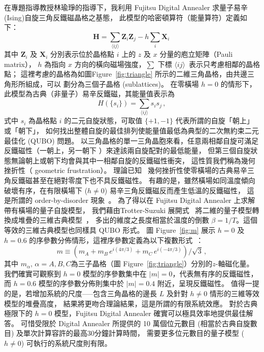 \documentclass[12pt]{article}
\newcommand{\abs}[1]{\lvert#1\rvert}
\newcommand{\e}[1]{\langle {#1}\rangle}
\newcommand{\be}{\begin{equation}}
\newcommand{\ee}{\end{equation}}
\begin{document}
在專題指導教授林瑜琤的指導下，我利用 Fujitsu Digital Annealer 求量子易辛(Ising)自旋三角反鐵磁晶格之基態，
此模型的哈密頓算符（能量算符）定義如下：
\be
   \bm{H}= \sum_{\e{ij}} \bm{Z}_i\bm{Z}_j - h\sum_i \bm{X}_i\,
    \label{eq:qising}
\ee 
其中 $\bm{Z}_i$ 及 $\bm{X}_i$ 分別表示位於晶格點 $i$ 上的 $z$ 及 $x$ 分量的庖立矩陣（Pauli matrix），
$h$ 為指向 $x$ 方向的橫向磁場強度，$\sum$ 下標 $\e{ij}$\ 表示只考慮相鄰的晶格點；
這裡考慮的晶格為如圖Figure~\ref{fig:triangle} 所示的二維三角晶格，由共邊三角形所組成，可以
劃分為三個子晶格 (sublattices)。
在零橫場 $h=0$ 的情形下，此模型為古典（非量子）易辛反鐵磁，其能量值表示為
\be
    H(\{ s_i \}) = \sum_{\e{ij}} s_i s_j\,,
    \label{eq:ising}    
\ee
式中 $s_i$ 為晶格點 $i$ 的二元自旋狀態，可取值 $\{+1,-1\}$ 代表所謂的自旋「朝上」或「朝下」，
如何找出整體自旋的最佳排列使能量值最低為典型的二次無約束二元最佳化 (QUBO) 問題。
以三角晶格的單一三角晶胞來看，任意兩相鄰自旋可滿足反鐵磁性（一朝上，另一朝下 ）來達該兩自旋配對的最低能量，
但第三個自旋狀態無論朝上或朝下均會與其中一相鄰自旋的反鐵磁性衝突，
這性質我們稱為幾何挫折性（ geometric frustration）。
理論已知~\cite{Wannier,Jiang}  幾何挫折性使零橫場的古典易辛三角反鐵磁甚至在絕對零度下也不具反鐵磁性。
有趣的是，雖然橫場如同溫度傾向破壞有序，在有限橫場下 ($h\neq 0$) 易辛三角反鐵磁反而產生低溫的反鐵磁性，
這是所謂的 order-by-disorder 現象~\cite{Moessner}。
為了得以在 Fujitsu Digital Annealer 上求解帶有橫場的量子自旋模型，
我們藉由Trotter-Suzuki 展開式~\cite{Textbook} 將二維的量子模型轉換成堆疊的三維古典模型~\cite{Moessner}，
多出的維度之長度相當於溫度的倒數 $\beta=1/T$。這個等效的三維古典模型也同樣具 QUBO 形式。
圖 Figure~\ref{fig:m} 展示 $h=0$ 及 $h=0.6$ 的序參數分佈情形，這裡序參數定義為以下複數形式~\cite{Moessner}：
\be
     m \equiv \left(m_A+m_B\,e^{i(4\pi/3)}+m_C\,e^{i(-4\pi/3)} \right)/\sqrt{3}\,,
     \label{eq:m}
\ee
其中 $m_\alpha,\,\alpha=A,B,C$為三子晶格（圖 Figure~\ref{fig:triangle}）分別的$z$-軸磁化量。
我們確實可觀察到 $h=0$ 模型的序參數集中在 $\abs{m}=0$，代表無有序的反鐵磁性，
而 $h=0.6$ 模型的序參數分佈則集中於 $\abs{m}=0.4$ 附近，呈現反鐵磁性。
值得一提的是，若增加系統的尺度-----包含三角晶格的邊長 $L$ 及針對 $h\neq 0$ 情形的三維等效模型的堆疊高度，
結果將更吻合理論結果，這是所謂的有限系統效應。
對於古典極限下的 $h=0$ 模型，Fujitsu Digital Annealer 確實可以極具效率地提供最佳解答。
可惜受限於 Digital Annealer 所提供的 10 萬個位元數目 (相當於古典自旋數目) 及單次計算容許的最高30分鐘計算時間，
需要更多位元數目的量子模型 ($h\neq 0$) 可執行的系統尺度則有限。
\end{document}
